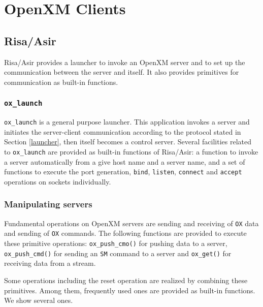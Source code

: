 
\section{OpenXM Clients}    

\subsection{Risa/Asir}

Risa/Asir provides a launcher to invoke an OpenXM server and to set up the
communication between the server and itself. It also provides primitives
for communication as built-in functions.

\subsubsection{{\tt ox\_launch}}
{\tt ox\_launch} is a general purpose launcher.  This application
invokes a server and initiates the server-client communication
according to the protocol stated in Section \ref{launcher}, then
itself becomes a control server.
Several facilities related to {{\tt ox\_launch}} are provided
as built-in functions of Risa/Asir: a function to invoke a server
automatically from a give host name and a server name, and a set 
of functions to execute the port generation, {\tt bind}, {\tt listen},
{\tt connect} and {\tt accept} operations on sockets individually.

\subsubsection{Manipulating servers}

Fundamental operations on OpenXM servers are sending and receiving
of {\tt OX} data and sending of {\tt OX} commands. The following functions
are provided to execute these primitive operations:
{\tt ox\_push\_cmo()} for pushing data to a server, 
{\tt ox\_push\_cmd()} for sending an {\tt SM} command to a server
and {\tt ox\_get()} for receiving data from a stream.

Some operations including the reset operation are realized by
combining these primitives.  Among them, frequently used ones are
provided as built-in functions. We show several ones.

